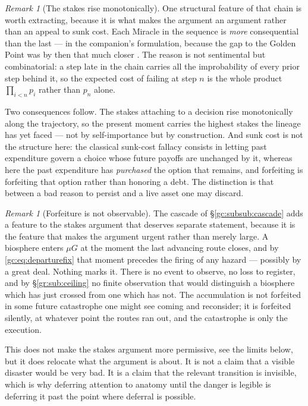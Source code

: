 \documentclass[11pt]{article}
\numberwithin{equation}{section}
\theoremstyle{plain}
\theoremstyle{definition}
\theoremstyle{remark}
\newtheorem{remark}[theorem]{Remark}
\begin{document}
\begin{remark}[The stakes rise monotonically]\label{hr:rem:monotone}
One structural feature of that chain is worth extracting, because it is
what makes the argument an argument rather than an appeal to sunk cost.
Each Miracle in the sequence is \emph{more} consequential than the last
--- in the companion's formulation, because the gap to the Golden Point
was by then that much closer \cite{Nexus}. The reason is not sentimental
but combinatorial: a step late in the chain carries all the improbability
of every prior step behind it, so the expected cost of failing at step
$n$ is the whole product $\prod_{i<n}p_i$ rather than $p_n$ alone.

Two consequences follow. The stakes attaching to a decision rise
monotonically along the trajectory, so the present moment carries the
highest stakes the lineage has yet faced --- not by self-importance but
by construction. And sunk cost is not the structure here: the classical
sunk-cost fallacy consists in letting past expenditure govern a choice
whose future payoffs are unchanged by it, whereas here the past
expenditure has \emph{purchased} the option that remains, and forfeiting
is forfeiting that option rather than honoring a debt. The distinction
is that between a bad reason to persist and a live asset one may
discard.
\end{remark}

\begin{remark}[Forfeiture is not observable]\label{hr:rem:silentforfeit}
The cascade of \S\ref{gc:subsub:cascade} adds a feature to the stakes
argument that deserves separate statement, because it is the feature
that makes the argument urgent rather than merely large. A biosphere enters $\mu G$ at the moment the last advancing route
closes, and by \eqref{gc:eq:departurefix} that moment precedes the
firing of any hazard --- possibly by a great deal. Nothing marks it.
There is no event to observe, no loss to register, and by
\S\ref{gr:sub:ceiling} no finite observation that would distinguish a
biosphere which has just crossed from one which has not. The
accumulation is not forfeited in some future catastrophe one might see
coming and reconsider; it is forfeited silently, at whatever point the
routes ran out, and the catastrophe is only the execution.

This does not make the stakes argument more permissive, see the
limits below, but it does relocate what the argument is about. It is
not a claim that a visible disaster would be very bad. It is a claim
that the relevant transition is invisible, which is why deferring
attention to anatomy until the danger is legible is deferring it past
the point where deferral is possible.
\end{remark}
\end{document}
